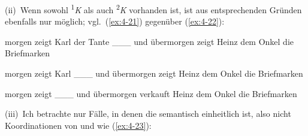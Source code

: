 \documentclass[output=paper]{langsci/langscibook}
\begin{document}
\begin{exe}
\ex
\label{ex:4-19}
\begin{xlist}

\end{xlist}
\ex
\label{ex:4-20}
\begin{xlist}


\end{xlist}
\end{exe}
(ii)~Wenn sowohl \textsuperscript{1}\textit{K} als auch \textsuperscript{2}\textit{K} vorhanden ist, ist aus entsprechenden Gründen ebenfalls nur  möglich; vgl.\ (\ref{ex:4-21}) gegenüber (\ref{ex:4-22}):

\begin{exe}
\ex
\label{ex:4-21}
\begin{xlist}
\ex%
\label{ex:4-21a}
morgen zeigt Karl der Tante \_\_\_ und übermorgen zeigt Heinz dem Onkel die Briefmarken

\ex%
\label{ex:4-21b}
morgen zeigt Karl \_\_\_ und übermorgen zeigt Heinz dem Onkel die Briefmarken

\ex%
\label{ex:4-21c}
morgen zeigt \_\_\_ und übermorgen verkauft Heinz dem Onkel die Briefmarken
\end{xlist}
\ex
\label{ex:4-22}
\begin{xlist}


\end{xlist}
\end{exe}
(iii)~Ich betrachte nur Fälle, in denen die  semantisch einheitlich ist, also \zb nicht Koordinationen von  und  wie (\ref{ex:4-23}):
\end{document}
